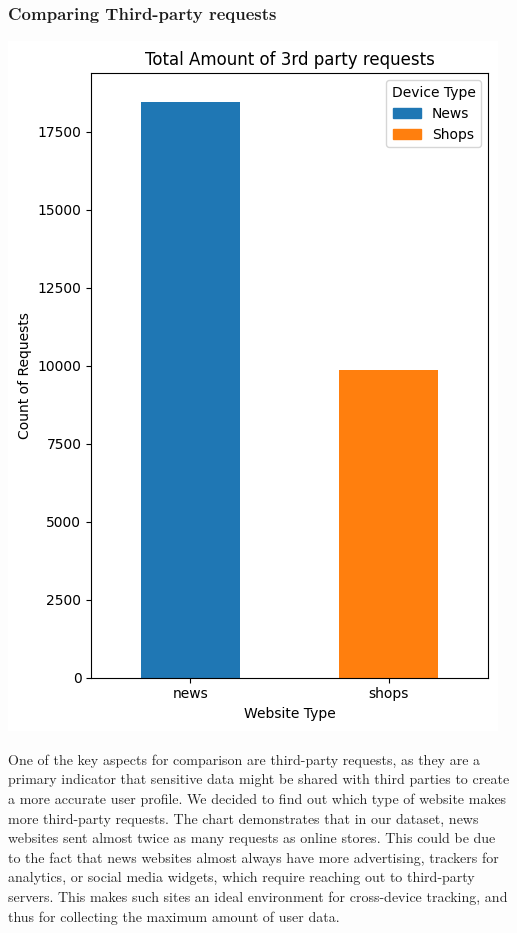 \subsubsection{Comparing Third-party requests}
\noindent 
\begin{minipage}{0.4\textwidth} 
    \includegraphics[width=\linewidth]{./assets/comparison1.png} 
\end{minipage}%
\hfill 
\begin{minipage}{0.5\textwidth} 
    One of the key aspects for comparison are third-party requests, as they are a primary indicator that sensitive data might be shared with third parties to create a more accurate user profile. We decided to find out which type of website makes more third-party requests. The chart demonstrates that in our dataset, news websites sent almost twice as many requests as online stores. This could be due to the fact that news websites almost always have more advertising, trackers for analytics, or social media widgets, which require reaching out to third-party servers. This makes such sites an ideal environment for cross-device tracking, and thus for collecting the maximum amount of user data.
\end{minipage}


